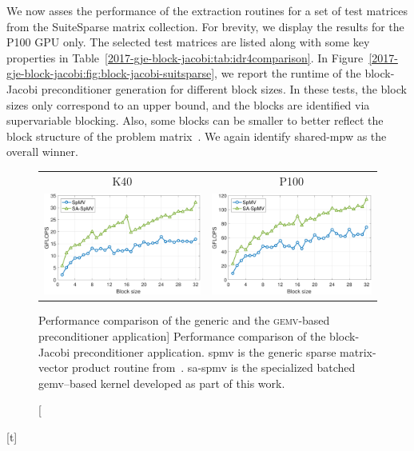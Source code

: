 We now asses the performance of the extraction routines for a set of test
matrices from the SuiteSparse matrix collection. For brevity, we display the
results for the P100 GPU only. The selected test matrices are listed along with
some key properties in Table~\ref{2017-gje-block-jacobi:tab:idr4comparison}. In
Figure~\ref{2017-gje-block-jacobi:fig:block-jacobi-suitsparse}, we report the runtime of the
block-Jacobi preconditioner generation for different block sizes. In these
tests, the block sizes only correspond to an upper bound, and the blocks are
identified via supervariable blocking. Also, some blocks can be smaller to better
reflect the block structure of the problem matrix~\cite{chow-scott-2016}. We
again identify {\sc shared-mpw} as the overall winner.


\begin{figure}[t]
\begin{center}
\begin{tabular}{cc}
K40 & P100\\
\includegraphics[width=.46\columnwidth]{plots/bjp_apply_bs_d_K40.pdf}
&
\includegraphics[width=.46\columnwidth]{plots/bjp_apply_bs_d_P100.pdf}
\end{tabular}
\end{center}
\caption
[Performance comparison of the generic and the \textsc{gemv}-based
preconditioner application]
{
Performance comparison of the block-Jacobi preconditioner application.
{\sc spmv} is the generic sparse matrix-vector product routine
from~\cite{Anzt:2017:BGE:3026937.3026940}.
{\sc sa-spmv} is the specialized batched {\sc gemv}--based kernel developed as part of this work.  
}
\label{2017-gje-block-jacobi:fig:precappl}
\end{figure}[t]


